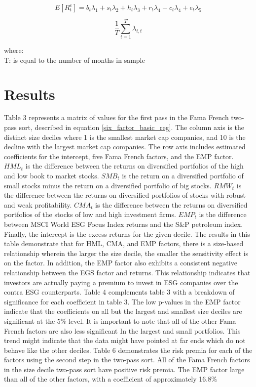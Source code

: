 \documentclass[12pt,oneside,reqno]{amsart}
\begin{document}
\begin{equation}
    E[R^e_{t}]= b_t\lambda_1+s_t\lambda_2 +h_t \lambda_3 +r_t\lambda_4 +c_t \lambda_4 + e_t \lambda_5
    \label{second_pass}
\end{equation}

\begin{equation}
    \frac{1}{T}\sum^T_{t=1}\lambda_{i,t}
    \label{summing_lamda}
\end{equation}
\begin{center}
    where:\\
    T: is equal to the number of months in sample
\end{center}

\section{Results}
\label{Results}
Table 3 represents a matrix of values for the first pass in the Fama French two-pass sort, described in equation \eqref{six_factor_basic_reg}. The column axis is the distinct size deciles where 1 is the smallest market cap companies, and 10 is the decline with the largest market cap companies. The row axis includes estimated coefficients for the intercept, five Fama French factors, and the EMP factor. $HML_{t}$ is the difference between the returns on diversified portfolios of the high and low book to market stocks.  $SMB_{t}$ is the return on a diversified portfolio of small stocks minus the return on a diversified portfolio of big stocks. $RMW_t$ is the difference between the returns on diversified portfolios of stocks with robust and weak profitability. $CMA_{t}$ is the difference between the returns on diversified portfolios of the stocks of low and high investment firms. $EMP_t$ is the difference between MSCI World ESG Focus Index returns and the S\&P petroleum index. Finally, the intercept is the excess returns for the given decile. The results in this table demonstrate that for HML, CMA, and EMP factors, there is a size-based relationship wherein the larger the size decile, the smaller the sensitivity effect is on the factor. In addition, the EMP factor also exhibits a consistent negative relationship between the EGS factor and returns. This relationship indicates that investors are actually paying a premium to invest in ESG companies over the contra ESG counterparts. Table 4 complements table 3 with a breakdown of significance for each coefficient in table 3. The low p-values in the EMP factor indicate that the coefficients on all but the largest and smallest size deciles are significant at the 5\% level. It is important to note that all of the other Fama French factors are also less significant In the largest and small portfolios. This trend might indicate that the data might have pointed at far ends which do not behave like the other deciles.  Table 6 demonstrates the risk premia for each of the factors using the second step in the two-pass sort. All of the Fama French factors in the size decile two-pass sort have positive risk premia. The EMP factor large than all of the other factors, with a coefficient of approximately  16.8\%
\end{document}
